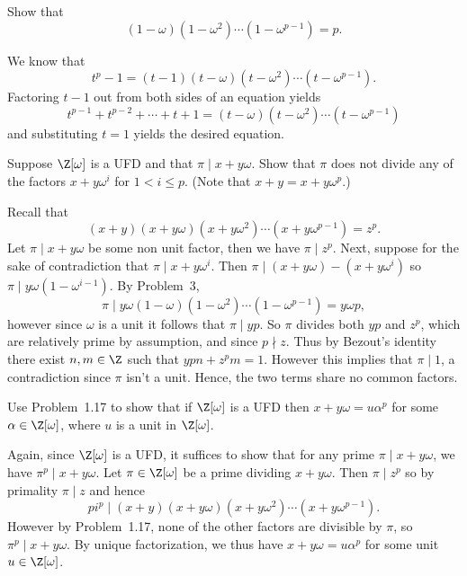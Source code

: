 \documentclass[11pt,letterpaper]{article}
\begin{document}
\begin{cproblem}{1.16}
  Show that 
  \[
    (1-\omega)(1-\omega^2)\cdots(1-\omega^{p-1})=p.
  \]
\end{cproblem}

\begin{solution}
  We know that 
  \[
    t^{p}-1=(t-1)(t-\omega)(t-\omega^2)\cdots(t-\omega^{p-1}).
  \]
  Factoring $t-1$ out from both sides of an equation yields
  \[
    t^{p-1}+t^{p-2}+\cdots+t+1 = (t-\omega)(t-\omega^2)\cdots(t-\omega^{p-1})
  \] 
  and substituting $t=1$ yields the desired equation.
\end{solution}

\begin{cproblem}{1.17}
  Suppose $\Z[\omega]$ is a UFD and that $\pi \mid x+y \omega$. Show that $\pi$ does not divide any of the factors $x+y\omega^i$ for $1<i\leq p$. (Note that $x+y=x+y\omega^p$.)   
\end{cproblem}

\begin{solution}
  Recall that 
  \[
    (x+y)(x+y\omega)(x+y \omega^2)\cdots(x+y \omega^{p-1})=z^p.
  \]
  Let $\pi \mid x+y\omega$ be some non unit factor, then we have $\pi \mid z^p$. Next, suppose for the sake of contradiction that $\pi \mid x+y\omega^i$. Then $\pi \mid (x+y\omega) - (x+y\omega^i)$ so $\pi \mid y\omega(1-\omega^{i-1})$. By Problem~3,
  \[
    \pi \mid y\omega(1-\omega)(1-\omega^2)\cdots (1-\omega^{p-1}) = y\omega p,
  \]  
  however since $\omega$ is a unit it follows that $\pi \mid yp$. So $\pi$ divides both $yp$ and $z^p$, which are relatively prime by assumption, and since $p\nmid z$. Thus by Bezout's identity there exist $n,m\in \Z$ such that $ypn+z^pm=1$. However this implies that $\pi \mid 1$, a contradiction since $\pi$ isn't a unit. Hence, the two terms share no common factors.   
\end{solution}

\begin{cproblem}{1.18}
  Use Problem~1.17 to show that if $\Z[\omega]$ is a UFD then $x+y\omega=u\alpha^p$ for some $\alpha\in \Z[\omega]$, where $u$ is a unit in $\Z[\omega]$.      
\end{cproblem}

\begin{solution}
  Again, since $\Z[\omega]$ is a UFD, it suffices to show that for any prime $\pi \mid x+y\omega$, we have $\pi^p \mid x+y\omega$. Let $\pi\in \Z[\omega]$ be a prime dividing $x+y\omega$. Then $\pi \mid z^p$ so by primality $\pi\mid z$ and hence \[pi^p \mid (x+y)(x+y\omega)(x+y\omega^2)\cdots(x+y\omega^{p-1}).\] However by Problem~1.17, none of the other factors are divisible by $\pi$, so $\pi^p\mid x+y\omega$. By unique factorization, we thus have $x+y\omega = u\alpha^p$ for some unit $u\in \Z[\omega]$.     
\end{solution}
\end{document}
